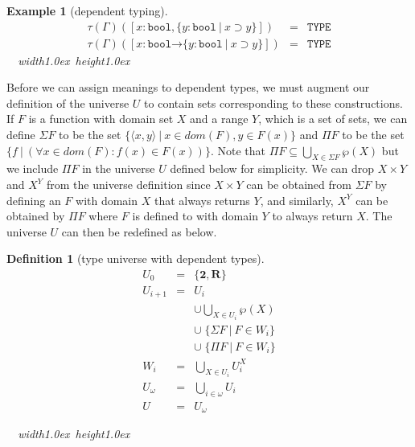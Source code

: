 \documentclass [12pt,twoside]{cslreport}
\newcommand{\thmbox}
   {{\ \hfill\hbox{%
      \vrule width1.0ex height1.0ex
   }\parfillskip 0pt }}
\newtheorem{example}[thm]{Example}
\newcommand{\aro}{\mathord\rightarrow} %
\newcommand{\pair}[1]{\langle #1 \rangle}
\newcommand{\union}{\cup}
\newcommand{\funtype}[2]{[#1 \aro #2]}
\newcommand{\tupletype}[1]{[#1]}
\newcommand{\tauGamma}[1]{\tau(\Gamma)(#1)}
\newcommand{\twob}{\mathbf{2}}
\newcommand{\reals}{\mathbf{R}}
\newcommand{\ttbool}{\mathtt{bool}}
\newcommand{\tttype}{\mathtt{TYPE}}
\newcommand{\vbar}{\ |\ }
\newenvironment{Eg}[1]{\begin{example}[#1]\label{eg:#1}\em }{\thmbox\end{example}}
\newtheorem{definition}{Definition}
\newenvironment{Defn}[1]{\begin{definition}[#1]\label{defn:#1}}{
\thmbox\end{definition}}
\begin{document}
\begin{Eg}{dependent typing}
\begin{eqnarray*}
\tauGamma{\tupletype{x : \ttbool,  \{ y : \ttbool \vbar x \supset
y\}}}
& = & \tttype\\
\tauGamma{\funtype{x : \ttbool}{\{ y : \ttbool \vbar x \supset 
y\}}} & = & \tttype
\end{eqnarray*}
\end{Eg}
Before we can assign meanings to dependent types, we must
augment our definition of the universe $U$ to contain sets corresponding
to these constructions.  If $F$ is a function with domain set $X$ and
a range $Y$, which is a set of sets, we can  define $\Sigma{F}$ to be the set 
$\{ \pair{x, y} \vbar x\in \textit{dom}(F), y\in F(x)\}$ and
$\Pi{F}$ to be the set $\{f \vbar (\forall x\in \textit{dom}(F): f(x)\in
F(x))\}$\@.   Note that $\Pi{F} \subseteq \bigcup_{X\in \Sigma{F}}\wp(X)$ but we
include $\Pi{F}$ in the universe $U$ defined below for simplicity\@.
We can drop $X\times Y$ and $X^Y$ from the universe definition since
$X\times Y$ can be obtained from $\Sigma{F}$ by defining an
$F$ with domain $X$ that always returns $Y$, and similarly,
$X^Y$ can be obtained by $\Pi{F}$ where $F$ is defined to with domain $Y$
to always return $X$\@.  The universe $U$ can then be redefined as below.  
\begin{Defn}{type universe with dependent types}
\begin{eqnarray*}
  U_0 & = & \{ {\twob}, {\reals}  \} \\
  U_{i+1} & = & U_i  \\& &
                          \union  \bigcup_{X\in U_i}\wp(X)\\& & 
                           \union\; \{\Sigma{F} \vbar F \in W_i\}\\& &
                            \union\; \{\Pi{F} \vbar F \in W_i\}\\
  W_i & = & \bigcup_{X\in U_i} U_i^X \\
  U_{\omega} & = & \bigcup_{i\in\omega} U_i\\
  U & = & U_{\omega}
\end{eqnarray*}
\end{Defn}
\end{document}
